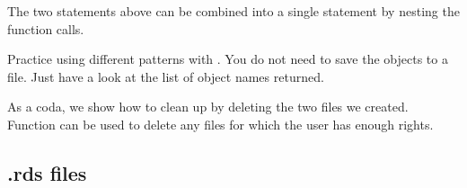 \documentclass[krantz2]{krantz}\usepackage{knitr}
\begin{document}
\begin{knitrout}\footnotesize
{}\color{fgcolor}\begin{kframe}
\begin{alltt}
 \hlkwb{<-} \hlstd{(} \hlstd{=} \hlstd{)}
\hlstd{(}   \hlstd{=} \hlstd{)}
\end{alltt}
\end{kframe}
\end{knitrout}

The two statements above can be combined into a single statement by nesting the function calls.

\begin{knitrout}\footnotesize
{}\color{fgcolor}\begin{kframe}
\begin{alltt}
\hlstd{(} \hlstd{=} \hlstd{(} \hlstd{=} \hlstd{),}  \hlstd{=} \hlstd{)}
\end{alltt}
\end{kframe}
\end{knitrout}

\begin{playground}
Practice using different patterns with . You do not need to save the objects to a file. Just have a look at the list of object names returned.
\end{playground}

As a coda, we show how to clean up by deleting the two files we created. Function  can be used to delete any files for which the user has enough rights.

\begin{knitrout}\footnotesize
{}\color{fgcolor}\begin{kframe}
\begin{alltt}
\hlstd{(}\hlstd{(}\hlstd{,} \hlstd{))}
\end{alltt}
\end{kframe}
\end{knitrout}

\subsection{.rds files}\label{sec:data:rds}
\end{document}
